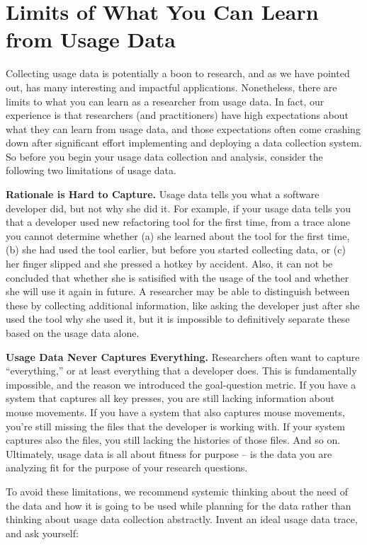 \section{Limits of What You Can Learn from Usage Data}
\label{sec:limitations}

Collecting usage data is potentially a boon to research, and as we have
pointed out, has many interesting and impactful applications.
Nonetheless, there are limits to what you can learn as a researcher
from usage data.
In fact, our experience is that researchers (and practitioners) have
high expectations about what they can learn from usage data, and those
expectations often come crashing down after significant effort implementing
and deploying a data collection system.
So before you begin your usage data collection and analysis, consider
the following two limitations of usage data.

\textbf{Rationale is Hard to Capture.}
Usage data tells you what a software developer did, but not
why she did it.
For example, if your usage data tells you that a developer used
new refactoring tool for the first time, from a trace alone you cannot determine whether
(a) she learned about the tool for the first time, (b) she had used the tool earlier, but before you started collecting data, or (c) her finger slipped and she pressed a hotkey by accident. Also, it can not be concluded that whether she is satisified with the usage of the tool and whether she will use it again in future.
A researcher may be able to distinguish between these by collecting additional information,
like asking the developer just after she used the tool why she used it,
but it is impossible to definitively separate these based on the
usage data alone.

\textbf{Usage Data Never Captures Everything.}
Researchers often want to capture ``everything,'' or at least
everything that a developer does.
This is fundamentally impossible, and the reason we introduced the
goal-question metric.
If you have a system that captures all key presses, you are still
lacking information about mouse movements.
If you have a system that also captures mouse movements, you're still
missing the files that the developer is working with.
If your system captures also the files, you still lacking the
histories of those files.
And so on.
Ultimately, usage data is all about fitness for purpose -- is the data
you are analyzing fit for the purpose of your research questions.

To avoid these limitations, we recommend systemic thinking about the need of the data and how it is going to be used while planning for the data rather than thinking about usage data collection abstractly.
Invent an ideal usage data trace, and ask yourself:


